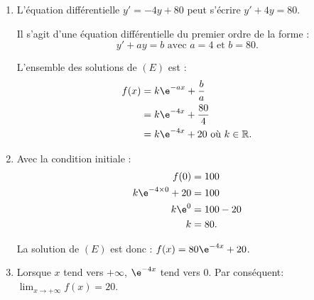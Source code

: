 \medskip

\begin{enumerate}
\item  L'équation différentielle $y' = -4y + 80$ peut s'écrire $y' + 4y = 80$.
    
Il s'agit d'une équation différentielle du premier ordre de la forme :
\[y' + ay = b \text{ avec } a = 4 \text{ et } b = 80.\]

L'ensemble des solutions de $(E)$ est :
\begin{align*}
f(x) &= k\e^{-ax} + \dfrac{b}{a} \\
&= k\e^{-4x} + \dfrac{80}{4} \\
&= k\e^{-4x} + 20 \text{ où } k \in \mathbb{R}.
\end{align*}

\item Avec la condition initiale :
\begin{align*}
f(0) &= 100 \\
k\e^{-4\times0} + 20 &= 100 \\
k\e^0 &= 100 - 20 \\
k &= 80.
\end{align*}

La solution de $(E)$ est donc : $f(x) = 80\e^{-4x} + 20$.

\item Lorsque $x$ tend vers $+\infty$, $\e^{-4x}$ tend vers $0$. Par conséquent: $\displaystyle\lim_{x \to +\infty} f(x)=20$.
\end{enumerate}
